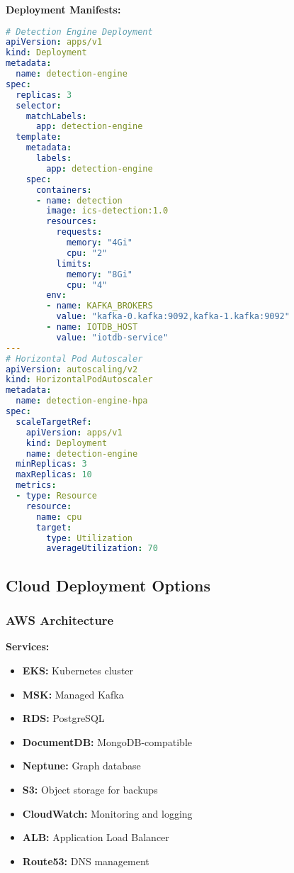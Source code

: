 \documentclass[12pt,a4paper]{article}
\begin{document}
\textbf{Deployment Manifests:}
\begin{lstlisting}[language=yaml]
# Detection Engine Deployment
apiVersion: apps/v1
kind: Deployment
metadata:
  name: detection-engine
spec:
  replicas: 3
  selector:
    matchLabels:
      app: detection-engine
  template:
    metadata:
      labels:
        app: detection-engine
    spec:
      containers:
      - name: detection
        image: ics-detection:1.0
        resources:
          requests:
            memory: "4Gi"
            cpu: "2"
          limits:
            memory: "8Gi"
            cpu: "4"
        env:
        - name: KAFKA_BROKERS
          value: "kafka-0.kafka:9092,kafka-1.kafka:9092"
        - name: IOTDB_HOST
          value: "iotdb-service"
---
# Horizontal Pod Autoscaler
apiVersion: autoscaling/v2
kind: HorizontalPodAutoscaler
metadata:
  name: detection-engine-hpa
spec:
  scaleTargetRef:
    apiVersion: apps/v1
    kind: Deployment
    name: detection-engine
  minReplicas: 3
  maxReplicas: 10
  metrics:
  - type: Resource
    resource:
      name: cpu
      target:
        type: Utilization
        averageUtilization: 70
\end{lstlisting}

\subsection{Cloud Deployment Options}

\subsubsection{AWS Architecture}

\textbf{Services:}
\begin{itemize}[leftmargin=1cm,itemsep=0pt]
    \item \textbf{EKS:} Kubernetes cluster
    \item \textbf{MSK:} Managed Kafka
    \item \textbf{RDS:} PostgreSQL
    \item \textbf{DocumentDB:} MongoDB-compatible
    \item \textbf{Neptune:} Graph database
    \item \textbf{S3:} Object storage for backups
    \item \textbf{CloudWatch:} Monitoring and logging
    \item \textbf{ALB:} Application Load Balancer
    \item \textbf{Route53:} DNS management
\end{itemize}
\end{document}
